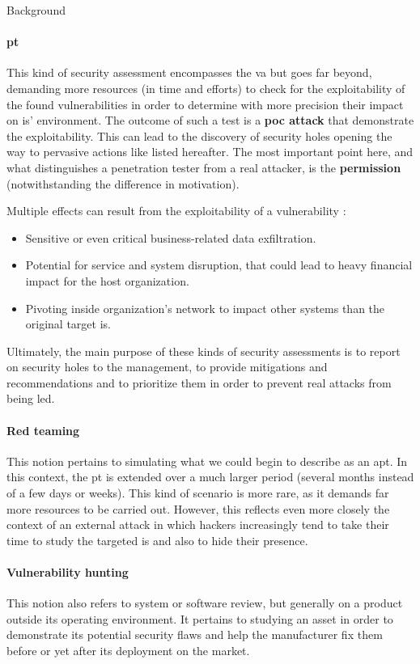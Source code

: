 \begin{chaptercover}{Background}
\paragraph{\acrfull{pt}} This kind of security assessment encompasses the \acrshort{va} but goes far beyond, demanding more resources (in time and efforts) to check for the exploitability of the found vulnerabilities in order to determine with more precision their impact on \acrshort{is}' environment. The outcome of such a test is a \textbf{\acrfull{poc} attack} that demonstrate the exploitability. This can lead to the discovery of security holes opening the way to pervasive actions like listed hereafter. The most important point here, and what distinguishes a penetration tester from a real attacker, is the \textbf{permission} (notwithstanding the difference in motivation).

Multiple effects can result from the exploitability of a vulnerability :
\begin{itemize}[itemsep=0.1cm,topsep=0.1cm]
  \item Sensitive or even critical business-related data exfiltration.
  \item Potential for service and system disruption, that could lead to heavy financial impact for the host organization.
  \item Pivoting inside organization's network to impact other systems than the original target \acrshort{is}.
\end{itemize}

Ultimately, the main purpose of these kinds of security assessments is to report on security holes to the management, to provide mitigations and recommendations and to prioritize them in order to prevent real attacks from being led.

\paragraph{Red teaming} This notion pertains to simulating what we could begin to describe as an \acrfull{apt}. In this context, the \acrshort{pt} is extended over a much larger period (several months instead of a few days or weeks). This kind of scenario is more rare, as it demands far more resources to be carried out. However, this reflects even more closely the context of an external attack in which hackers increasingly tend to take their time to study the targeted \acrshort{is} and also to hide their presence.

\paragraph{Vulnerability hunting} This notion also refers to system or software review, but generally on a product outside its operating environment. It pertains to studying an asset in order to demonstrate its potential security flaws and help the manufacturer fix them before or yet after its deployment on the market.


\end{chaptercover}
